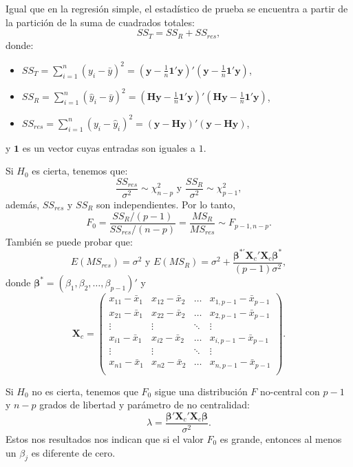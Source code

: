 \documentclass[
]{article}
\providecommand{\tightlist}{%
  \setlength{\itemsep}{0pt}\setlength{\parskip}{0pt}}
\begin{document}
Igual que en la regresión simple, el estadístico de prueba se encuentra a partir de la partición de la suma de cuadrados totales:
\[
SS_{T}  = SS_{R} + SS_{res},
\]
donde:

\begin{itemize}
\tightlist
\item
  \(SS_{T} = \sum_{i=1}^{n}(y_{i}-\bar{y})^{2} = (\boldsymbol y- \frac{1}{n}\boldsymbol 1'\boldsymbol y)'(\boldsymbol y- \frac{1}{n}\boldsymbol 1'\boldsymbol y)\),
\item
  \(SS_{R} = \sum_{i=1}^{n}(\widehat{y}_{i}-\bar{y})^{2} = (\boldsymbol H\boldsymbol y- \frac{1}{n}\boldsymbol 1'\boldsymbol y)'(\boldsymbol H\boldsymbol y- \frac{1}{n}\boldsymbol 1'\boldsymbol y)\),
\item
  \(SS_{res} = \sum_{i=1}^{n}(y_{i}-\widehat{y}_{i})^{2} = (\boldsymbol y- \boldsymbol H\boldsymbol y)'(\boldsymbol y- \boldsymbol H\boldsymbol y)\),
\end{itemize}

y \(\boldsymbol 1\) es un vector cuyas entradas son iguales a \(1\).

Si \(H_{0}\) es cierta, tenemos que:
\[
\frac{SS_{res}}{\sigma^{2}}\sim\chi^{2}_{n-p} \mbox{ y } \frac{SS_{R}}{\sigma^{2}} \sim \chi^{2}_{p-1},
\]
además, \(SS_{res}\) y \(SS_{R}\) son independientes. Por lo tanto,
\[
F_{0} = \frac{SS_{R}/(p-1)}{SS_{res}/(n-p)} = \frac{MS_{R}}{MS_{res}} \sim F_{p-1,n-p}.
\]
También se puede probar que:
\[
E(MS_{res}) =  \sigma^{2} \mbox{ y }E(MS_{R}) =  \sigma^{2} + \frac{\boldsymbol \beta^{*'}\boldsymbol X_{c}'\boldsymbol X_{c}\boldsymbol \beta^{*}}{(p-1)\sigma^{2}},
\]
donde \(\boldsymbol \beta^{*} = (\beta_{1},\beta_{2},\ldots,\beta_{p-1})'\) y
\[
\boldsymbol X_{c} = \begin{pmatrix}
x_{11} - \bar{x}_{1} & x_{12} - \bar{x}_{2} & \ldots & x_{1,p-1} - \bar{x}_{p-1} \\ 
x_{21} - \bar{x}_{1} & x_{22} - \bar{x}_{2} & \ldots & x_{2,p-1} - \bar{x}_{p-1} \\ 
\vdots & \vdots & \ddots & \vdots \\
x_{i1} - \bar{x}_{1} & x_{i2} - \bar{x}_{2} & \ldots & x_{i,p-1} - \bar{x}_{p-1} \\ 
\vdots & \vdots & \ddots & \vdots \\
x_{n1} - \bar{x}_{1} & x_{n2} - \bar{x}_{2} & \ldots & x_{n,p-1} - \bar{x}_{p-1} \\ 
\end{pmatrix}.
\]

Si \(H_{0}\) no es cierta, tenemos que \(F_{0}\) sigue una distribución \(F\) no-central con \(p-1\) y \(n-p\) grados de libertad y parámetro de no centralidad:
\[
\lambda = \frac{\boldsymbol \beta'\boldsymbol X_{c}'\boldsymbol X_{c}\boldsymbol \beta}{\sigma^{2}}.
\]
Estos nos resultados nos indican que si el valor \(F_{0}\) es grande, entonces al menos un \(\beta_{j}\) es diferente de cero.
\end{document}
